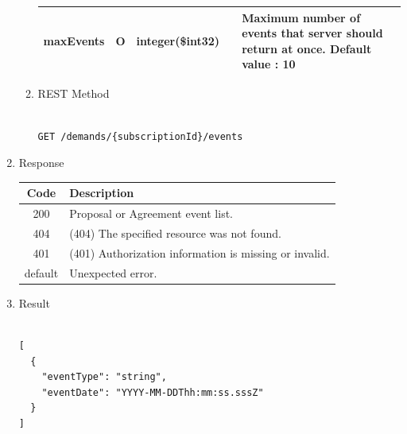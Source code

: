 \begin{enumerate}
\begin{enumerate}
\begin{table}[H]
\begin{center}
\begin{tabular}{|p{3cm}|l|p{3cm}|p{3cm}|p{4cm}|}
\hline

maxEvents		& O & integer(\$int32)	&		&	Maximum number of events that server should return at once.		Default value : 10 \\

\hline	

\end{tabular}
\end{center}

\end{table}

\item REST Method

\begin{tcolorbox}[boxrule=0pt, frame empty]
\begin{verbatim} 

GET /demands/{subscriptionId}/events

\end{verbatim}
\end{tcolorbox}

\end{enumerate}

\item Response

\begin{table}[H]
\footnotesize

\begin{center}
\begin{tabular}{|c|l|} 
\hline
\rowcolor{lightgray}	Code 		& 	Description \\
\hline
200	 		&	Proposal or Agreement event list. \\
\hline
404			&	(404) The specified resource was not found. \\
\hline
401			&	(401) Authorization information is missing or invalid. \\
\hline
default		&	Unexpected error. \\
\hline
\end{tabular}
\end{center}

\end{table}

\item Result

\begin{tcolorbox}[boxrule=0pt, frame empty]
\begin{verbatim}

[
  {
    "eventType": "string",
    "eventDate": "YYYY-MM-DDThh:mm:ss.sssZ"
  }
]


\end{verbatim}
\end{tcolorbox}
\end{enumerate}
